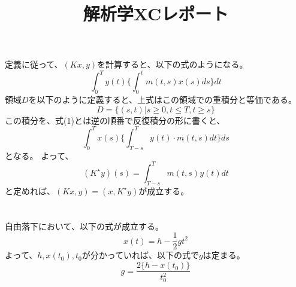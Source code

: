 \documentclass{jarticle}
\title{解析学XCレポート}
\author{}
\begin{document}
\maketitle

\section{}
定義に従って、$(Kx,y)$を計算すると、以下の式のようになる。
\begin{equation}
\int_0^T y(t)\{\int^t_0 m(t,s)x(s) ds \} dt
\end{equation}
領域$D$を以下のように定義すると、上式はこの領域での重積分と等価である。
\begin{equation}
D = \{(s,t)|s \geq 0,t \leq T,t\geq s \}
\end{equation}
この積分を、式(1)とは逆の順番で反復積分の形に書くと、
\begin{equation}
\int^T_0 x(s)\{\int^T_{T-s} y(t)\cdot m(t,s) dt\} ds
\end{equation}
となる。
よって、
\begin{equation}
(K^{\star}y)(s) = \int^T_{T-s} m(t,s)y(t) dt
\end{equation}
と定めれば、$(Kx,y) = (x,K^{\star}y)$が成立する。

\section{}
\subsection{}
自由落下において、以下の式が成立する。
\begin{equation}
x(t) = h - \frac{1}{2} gt^2
\end{equation}
よって、$h,x(t_0),t_0$が分かっていれば、以下の式で$g$は定まる。
\begin{equation}
g = \frac{2\{h-x(t_0)\}}{t_0^2}
\end{equation}
\end{document}
